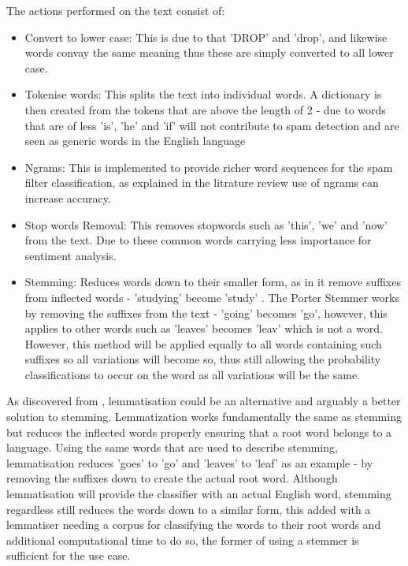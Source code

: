 \documentclass[oneside, 12pt]{article}
\begin{document}
			The actions performed on the text consist of:
			\begin{itemize}
				\item Convert to lower case: This is due to that 'DROP' and 'drop', and likewise words convay the same meaning thus these are simply converted to all lower case.
				\item Tokenise words: This splits the text into individual words. A dictionary is then created from the tokens that are above the length of 2 - due to words that are of less 'is', 'he' and 'if' will not contribute to spam detection and are seen as generic words in the English language
				\item Ngrams: This is implemented to provide richer word sequences for the spam filter classification, as explained in the litrature review use of ngrams can increase accuracy.
				\item Stop words Removal: This removes stopwords such as 'this', 'we' and 'now' from the text. Due to these common words carrying less importance for sentiment analysis.
				\item Stemming: Reduces words down to their smaller form, as in it remove suffixes from inflected words - 'studying' become 'study' \cite{StemvsLem}. The Porter Stemmer works by removing the suffixes from the text - 'going' becomes 'go', however, this applies to other words such as 'leaves' becomes 'leav' which is not a word. However, this method will be applied equally to all words containing such suffixes so all variations will become so, thus still allowing the probability classifications to occur on the word as all variations will be the same. 
			\end{itemize}
			
			As discovered from \cite{StemvsLem}, lemmatisation could be an alternative and arguably a better solution to stemming. Lemmatization works fundamentally the same as stemming but reduces the inflected words properly ensuring that a root word belongs to a language. Using the same words that are used to describe stemming, lemmatisation reduces 'goes' to 'go' and 'leaves' to 'leaf' as an example - by removing the suffixes down to create the actual root word.
			Although lemmatisation will provide the classifier with an actual English word, stemming regardless still reduces the words down to a similar form, this added with a lemmatiser needing a corpus for classifying the words to their root words and additional computational time to do so, the former of using a stemmer is sufficient for the use case.
			
\end{document}
